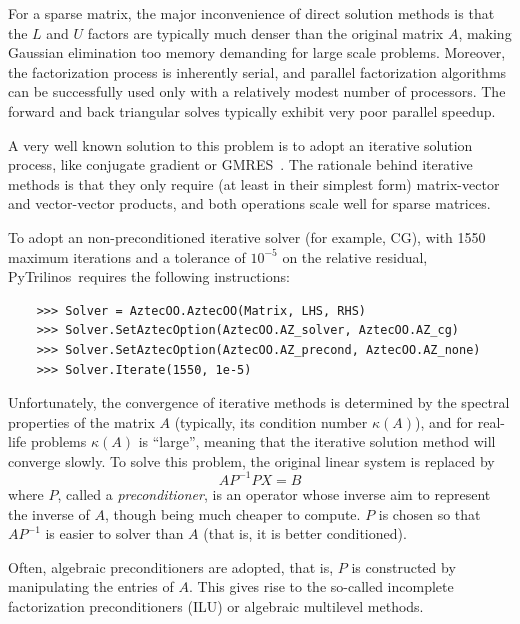 \documentclass[10pt,relax]{SANDreport}
\newcommand{\PyTrilinos}{{PyTrilinos}}
\begin{document}
For a sparse matrix, the major inconvenience of direct solution
methods is that the $L$ and $U$ factors are typically much denser than
the original matrix $A$, making Gaussian elimination too memory
demanding for large scale problems. Moreover, the factorization
process is inherently serial, and parallel factorization algorithms
can be successfully used only with a relatively modest number of
processors. The forward and back triangular solves typically exhibit
very poor parallel speedup.

A very well known solution to this problem is to adopt an iterative
solution process, like conjugate gradient or GMRES~\cite{FIXME}. The
rationale behind iterative methods is that they only require (at least
in their simplest form) matrix-vector and vector-vector products, and
both operations scale well for sparse matrices.

To adopt an non-preconditioned iterative solver (for example, CG),
with 1550 maximum iterations and a tolerance of $10^{-5}$ on the
relative residual, \PyTrilinos\ requires the following instructions:
\begin{verbatim}
    >>> Solver = AztecOO.AztecOO(Matrix, LHS, RHS)
    >>> Solver.SetAztecOption(AztecOO.AZ_solver, AztecOO.AZ_cg)
    >>> Solver.SetAztecOption(AztecOO.AZ_precond, AztecOO.AZ_none)
    >>> Solver.Iterate(1550, 1e-5)
\end{verbatim}

Unfortunately, the convergence of iterative methods is determined by
the spectral properties of the matrix $A$ (typically, its condition
number $\kappa(A)$), and for real-life problems $\kappa(A)$ is
``large'', meaning that the iterative solution method will converge
slowly. To solve this problem, the original linear system is replaced
by
\[
A P^{-1} P X = B
\]
where $P$, called a {\sl preconditioner}, is an operator whose inverse
aim to represent the inverse of $A$, though being much cheaper to
compute.  $P$ is chosen so that $AP^{-1}$ is easier to solver than $A$
(that is, it is better conditioned).

\smallskip

Often, algebraic preconditioners are adopted, that is, $P$ is
constructed by manipulating the entries of $A$. This gives rise to the
so-called incomplete factorization preconditioners (ILU) or algebraic
multilevel methods.
\end{document}
